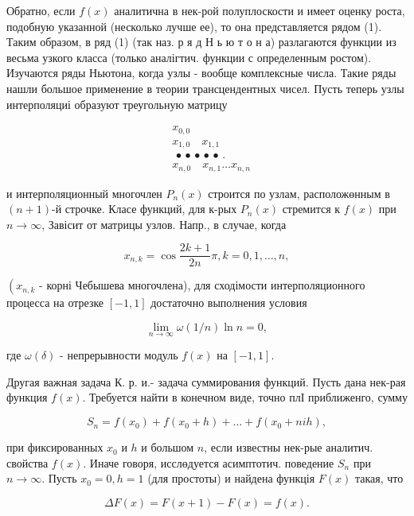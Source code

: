 \documentclass[10pt]{article}
\begin{document}
Обратно, если $f(x)$ аналитична в нек-рой полуплоскости и имеет оценку роста, подобную указанной (несколько лучше ее), то она представляется рядом (1). Таким образом, в ряд (1) (так наз. р я д Н ь ю т о н а) разлагаются функции из весьма узкого класса (только аналігтич. функции с определенным ростом). Изучаются ряды Ньютона, когда узлы - вообще комплексные числа. Такие ряды нашли большое применение в теории трансцендентных чисел. Пусть теперь узлы интерполяциі образуют треугольную матрицу



\[

\begin{aligned}

& x_{0,0} \\

& x_{1,0} \quad x_{1,1} \\

& \text { • • • • • . } \\

& x_{n, 0} \quad x_{n, 1} \ldots x_{n, n}

\end{aligned}

\]



и интерполяционный многочлен $P_{n}(x)$ строится по узлам, расположөнным в $(n+1)$-й строчке. Класе функций, для к-рых $P_{n}(x)$ стремится к $f(x)$ при $n \rightarrow \infty$, Завісит от матрицы узлов. Напр., в случае, когда



\[

x_{n, k}=\cos \frac{2 k+1}{2 n} \pi, k=0,1, \ldots, n,

\]



$\left(x_{n, k}\right.$ - корні Чебышева многочлена), для сходімости интерполяционного процесса на отрезке $[-1,1]$ достаточно выполнения условия



\[

\lim _{n \rightarrow \infty} \omega(1 / n) \ln n=0,

\]



где $\omega(\delta)$ - непрерывности модуль $f(x)$ на $[-1,1]$.



Другая важная задача К. р. и.- задача суммирования функций. Пусть дана нек-рая функция $f(x)$. Требуется найти в конечном виде, точно плІ приближенго, сумму



\[

S_{n}=f\left(x_{0}\right)+f\left(x_{0}+h\right)+\ldots+f\left(x_{0}+n i h\right),

\]



при фиксированных $x_{0}$ и $h$ и большом $n$, если известны нек-рые аналитич. свойства $f(x)$. Иначе говоря, исслөдуется асимптотич. поведение $S_{n}$ при $n \rightarrow \infty$. Пусть $x_{0}=0, h=1$ (для простоты) и найдена функція $F(x)$ такая, что



\[

\Delta F(x)=F(x+1)-F(x)=f(x) .

\]
\end{document}
